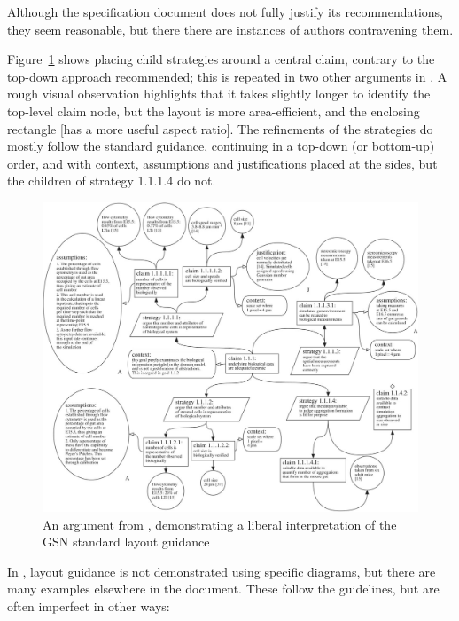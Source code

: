 Although the specification document does not fully justify its recommendations, they seem reasonable, but there there are instances of authors contravening them.

Figure~\ref{fig:aldencentral} shows \citet{royal} placing child strategies around a central claim, contrary to the top-down approach recommended; this is repeated in two other arguments in \cite[pp.~8--9]{royal} .
A rough visual observation highlights that it takes slightly longer to identify the top-level claim node, but the layout is more area-efficient, and the enclosing rectangle  [has a more useful aspect ratio].
The refinements of the strategies do mostly follow the standard guidance, continuing in a top-down (or bottom-up) order, and with context, assumptions and justifications placed at the sides, but the children of strategy 1.1.1.4 do not.

\begin{figure}
    \includegraphics[width=\textwidth]{graphics/aldencentral.jpg}
    \caption{An argument from \cite{royal}, demonstrating a liberal interpretation of the GSN standard layout guidance}
    \label{fig:aldencentral}
\end{figure}

In \cite{gsnstandard}, layout guidance is not demonstrated using specific diagrams, but there are many examples elsewhere in the document. These follow the guidelines, but are often imperfect in other ways:

